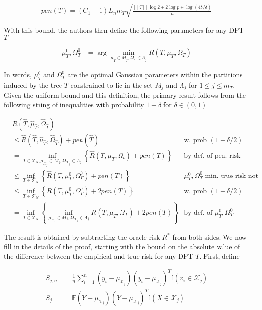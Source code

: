\begin{align}
  pen(T) = (C_1 + 1) L_n m_T \sqrt{\frac{[[T]] \log 2 + 2 \log p + \log(48/\delta)}{n}}
\end{align}

With this bound, the authors then define the following parameters for
any DPT $T$

\begin{align}
  \mu_T^0, \Omega_T^0 &= \arg\min_{\mu_T \in M_j, \Omega_T \in \Lambda_j} R(T, \mu_T, \Omega_T)
\end{align}

In words, $\mu_T^0$ and $\Omega_T^0$ are the optimal Gaussian
parameters within the partitions induced by the tree $T$ constrained
to lie in the set $M_j$ and $\Lambda_j$ for $1 \le j \le m_T$. Given
the uniform bound and this definition, the primary result follows from
the following string of inequalities with probability $1-\delta$ for
$\delta \in (0, 1)$

\begin{align}
  &R(\hat{T}, \hat{\mu}_{\hat{T}}, \hat{\Omega}_{\hat{T}}) & \\
  &\le \hat{R}(\hat{T}, \hat{\mu}_{\hat{T}}, \hat{\Omega}_{\hat{T}}) + pen(\hat{T}) & \text{w. prob } (1 - \delta/2) \\
  &= \inf_{T \in \mathcal{T}_N, \mu_{\mathcal{X}_j} \in M_j, \Omega_{\mathcal{X}_j} \in \Lambda_j}
  \left\{
    \hat{R}(T, \mu_T, \Omega_t) + pen(T)
  \right\} & \text{by def. of pen. risk est.} \\
  &\le \inf_{T \in \mathcal{T}_N}
  \left\{
    \hat{R}(T, \mu_T^0, \Omega_T^0) + pen(T)
  \right\} & \mu_T^0, \Omega_T^0 \text{ min. true risk not emp. risk} \\
  &\le \inf_{T \in \mathcal{T}_N}
  \left\{
    R(T, \mu_T^0, \Omega_T^0) + 2pen(T)
  \right\} & \text{w. prob } (1 - \delta/2) \\
  &= \inf_{T \in \mathcal{T}_N}
  \left\{
    \inf_{\mu_{\mathcal{X}_j} \in M_j, \Omega_{\mathcal{X}_j} \in \Lambda_j}
    R(T, \mu_T, \Omega_T) + 2pen(T)
  \right\} & \text{by def. of } \mu_T^0, \Omega_T^0
\end{align}

The result is obtained by subtracting the oracle risk $R^*$ from both
sides. We now fill in the details of the proof, starting with the
bound on the absolute value of the difference between the empirical
and true risk for any DPT $T$. First, define

\begin{align}
  S_{j,n} &= \frac{1}{n} \sum_{i=1}^n (y_i - \mu_{\mathcal{X}_j}) (y_i - \mu_{\mathcal{X}_j})^T \mathbb{I}(x_i \in \mathcal{X}_j) \\
  \bar{S}_j &= \mathbb{E} (Y - \mu_{\mathcal{X}_j}) (Y - \mu_{\mathcal{X}_j})^T \mathbb{I}(X \in \mathcal{X}_j)
\end{align}

